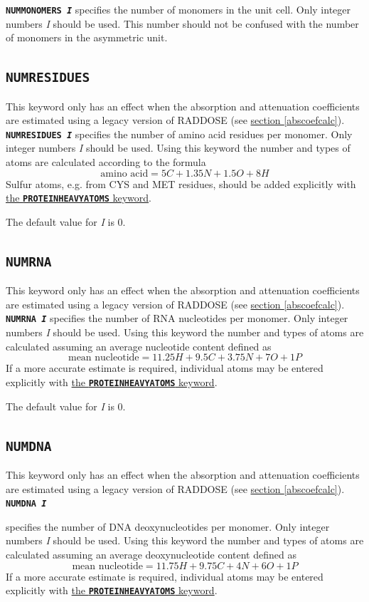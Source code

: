 \documentclass[a4paper]{article}
\newcommand{\Keyword}[1]{\texttt{\textbf{#1}}\xspace}
\newcommand{\SB}{\\[0.2em]}
\newcommand{\RDLegacyKeyword}{This keyword only has an effect when the absorption and attenuation coefficients are estimated using a legacy version of RADDOSE (see \hyperref[abscoefcalc]{section \ref*{abscoefcalc}}).\SB
}
\begin{document}
\noindent \Keyword{NUMMONOMERS \textit{I}}
specifies the number of monomers in the unit cell. Only integer numbers \textit{I} should be used. This number should not be confused with the number of monomers in the asymmetric unit.


\subsection{\Keyword{NUMRESIDUES}}
\label{numresidues}
\RDLegacyKeyword

\noindent \Keyword{NUMRESIDUES \textit{I}}
specifies the number of amino acid residues per monomer. Only integer numbers \textit{I} should be used. Using this keyword the number and types of atoms are calculated according to the formula
\[ \mbox{amino acid} = 5 C + 1.35 N + 1.5 O + 8 H \]
Sulfur atoms, e.g. from CYS and MET residues, should be added explicitly with \hyperref[proteinheavyatoms]{the \Keyword{PROTEINHEAVYATOMS} keyword}.

The default value for \textit{I} is 0.


\subsection{\Keyword{NUMRNA}}
\label{numrna}
\RDLegacyKeyword

\noindent \Keyword{NUMRNA \textit{I}}
specifies the number of RNA nucleotides per monomer. Only integer numbers \textit{I} should be used. Using this keyword the number and types of atoms are calculated assuming an average nucleotide content defined as
\[ \mbox{mean nucleotide} = 11.25H + 9.5C + 3.75N + 7O + 1P \]
If a more accurate estimate is required, individual atoms may be entered explicitly with \hyperref[proteinheavyatoms]{the \Keyword{PROTEINHEAVYATOMS} keyword}.

The default value for \textit{I} is 0.


\subsection{\Keyword{NUMDNA}}
\label{numdna}
\RDLegacyKeyword

\noindent \Keyword{NUMDNA \textit{I}}

specifies the number of DNA deoxynucleotides per monomer. Only integer numbers \textit{I} should be used. Using this keyword the number and types of atoms are calculated assuming an average deoxynucleotide content defined as
\[ \mbox{mean nucleotide} = 11.75H + 9.75C + 4N + 6O + 1P \]
If a more accurate estimate is required, individual atoms may be entered explicitly with \hyperref[proteinheavyatoms]{the \Keyword{PROTEINHEAVYATOMS} keyword}.
\end{document}
